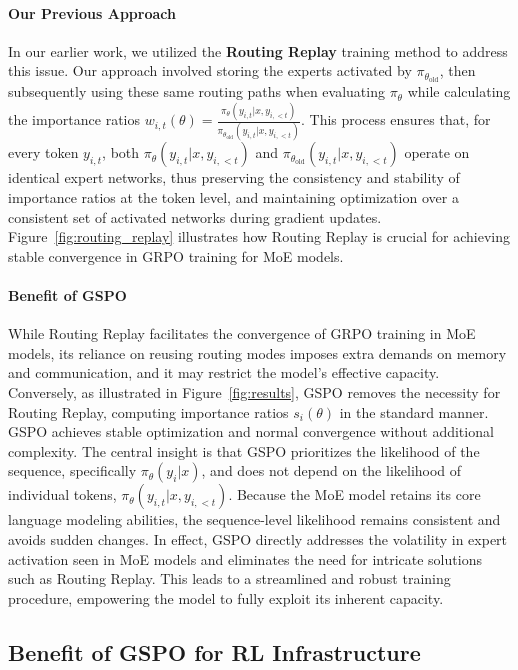\paragraph{Our Previous Approach} In our earlier work, we utilized the \textbf{Routing Replay} training method to address this issue. Our approach involved storing the experts activated by $\pi_{\theta_\text{old}}$, then subsequently using these same routing paths when evaluating $\pi_{\theta}$ while calculating the importance ratios $w_{i,t}(\theta) = \frac{ \pi_{\theta} (y_{i,t} | x, y_{i,<t}) }{ \pi_{\theta_\text{old}} (y_{i,t} | x,y_{i,<t})}$. This process ensures that, for every token $y_{i,t}$, both $\pi_{\theta} (y_{i,t} | x, y_{i,<t})$ and $\pi_{\theta_\text{old}} (y_{i,t} | x,y_{i,<t})$ operate on identical expert networks, thus preserving the consistency and stability of importance ratios at the token level, and maintaining optimization over a consistent set of activated networks during gradient updates. Figure~\ref{fig:routing_replay} illustrates how Routing Replay is crucial for achieving stable convergence in GRPO training for MoE models.

\paragraph{Benefit of GSPO} While Routing Replay facilitates the convergence of GRPO training in MoE models, its reliance on reusing routing modes imposes extra demands on memory and communication, and it may restrict the model's effective capacity. Conversely, as illustrated in Figure~\ref{fig:results}, GSPO removes the necessity for Routing Replay, computing importance ratios $s_i(\theta)$ in the standard manner. GSPO achieves stable optimization and normal convergence without additional complexity. The central insight is that GSPO prioritizes the likelihood of the sequence, specifically $\pi_{\theta} (y_i | x)$, and does not depend on the likelihood of individual tokens, $\pi_{\theta} (y_{i,t} | x, y_{i,<t})$. Because the MoE model retains its core language modeling abilities, the sequence-level likelihood remains consistent and avoids sudden changes. In effect, GSPO directly addresses the volatility in expert activation seen in MoE models and eliminates the need for intricate solutions such as Routing Replay. This leads to a streamlined and robust training procedure, empowering the model to fully exploit its inherent capacity.

\subsection{Benefit of GSPO for RL Infrastructure}

